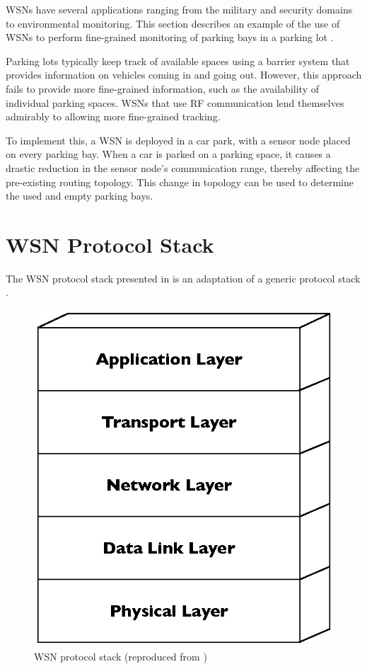 WSNs have several applications ranging from the military and security domains to
environmental monitoring. This section describes an example of the use of WSNs
to perform fine-grained monitoring of parking bays in a parking lot \cite{benson_carpark}.

Parking lots typically keep track of available spaces using a barrier system
that provides information on vehicles coming in and going out. However, this
approach fails to provide more fine-grained information, such as the
availability of individual parking spaces. WSNs that use RF communication lend
themselves admirably to allowing more fine-grained tracking. 

To implement this, a WSN is deployed in a car park, with a sensor node placed on every
parking bay. When a car is parked on a parking space, it causes a drastic
reduction in the sensor node's communication range, thereby affecting the
pre-existing routing topology. This change in topology can be used to determine
the used and empty parking bays.

\section{WSN Protocol Stack} \label{sec:WSNProtStack}

The WSN protocol stack presented in \cite{SensorSurveyAkyildiz:2002} is an
adaptation of a generic protocol stack \cite{ComputerNetworksTannenbaum:2003}.


\begin{figure}[h]
\centering
\includegraphics[scale=0.65]{img/ProtStack.eps}
\caption[WSN protocol stack]{WSN protocol stack (reproduced from \cite{SensorSurveyAkyildiz:2002})}
\label{Fig:ProtStack}
\end{figure}


